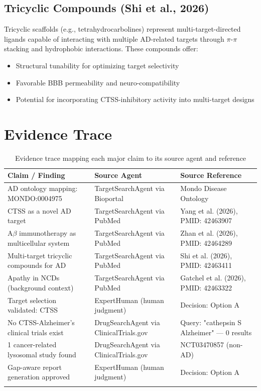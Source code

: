 \documentclass[11pt, a4paper]{article}
\begin{document}
\subsection{Tricyclic Compounds (Shi et al., 2026)}

Tricyclic scaffolds (e.g., tetrahydrocarbolines) represent multi-target-directed ligands capable of interacting with multiple AD-related targets through $\pi$-$\pi$ stacking and hydrophobic interactions. These compounds offer:
\begin{itemize}
    \item Structural tunability for optimizing target selectivity
    \item Favorable BBB permeability and neuro-compatibility
    \item Potential for incorporating CTSS-inhibitory activity into multi-target designs
\end{itemize}

\section{Evidence Trace}

\begin{longtable}{p{4cm} p{4cm} p{6cm}}
\toprule
\textbf{Claim / Finding} & \textbf{Source Agent} & \textbf{Source Reference} \\
\midrule
\endhead
AD ontology mapping: MONDO:0004975 & TargetSearchAgent via Bioportal & Mondo Disease Ontology \\
CTSS as a novel AD target & TargetSearchAgent via PubMed & Yang et al. (2026), PMID: 42463907 \\
A$\beta$ immunotherapy as multicellular system & TargetSearchAgent via PubMed & Zhan et al. (2026), PMID: 42464289 \\
Multi-target tricyclic compounds for AD & TargetSearchAgent via PubMed & Shi et al. (2026), PMID: 42463411 \\
Apathy in NCDs (background context) & TargetSearchAgent via PubMed & Gatchel et al. (2026), PMID: 42463322 \\
Target selection validated: CTSS & ExpertHuman (human judgment) & Decision: Option A \\
No CTSS-Alzheimer's clinical trials exist & DrugSearchAgent via ClinicalTrials.gov & Query: "cathepsin S Alzheimer" — 0 results \\
1 cancer-related lysosomal study found & DrugSearchAgent via ClinicalTrials.gov & NCT03470857 (non-AD) \\
Gap-aware report generation approved & ExpertHuman (human judgment) & Decision: Option A \\
\bottomrule
\caption{Evidence trace mapping each major claim to its source agent and reference}
\end{longtable}
\end{document}
